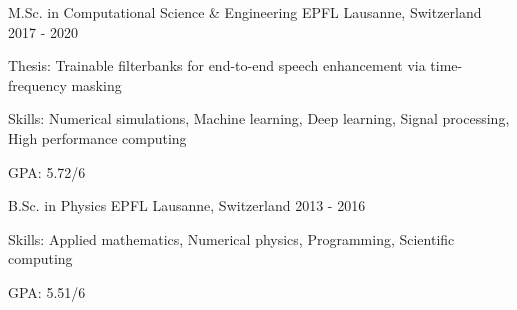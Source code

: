 

\begin{cventries}

  \cventry
    {M.Sc. in Computational Science \& Engineering} %
    {EPFL} %
    {Lausanne, Switzerland} %
    {2017 - 2020} %
    {
      \begin{cvitems} %
        \item {Thesis: Trainable filterbanks for end-to-end speech enhancement via time-frequency masking}
        \item {Skills: Numerical simulations, Machine learning, Deep learning, Signal processing, High performance computing}
        \item {GPA: 5.72/6}
      \end{cvitems}
    }

  \cventry
    {B.Sc. in Physics} %
    {EPFL} %
    {Lausanne, Switzerland} %
    {2013 - 2016} %
    {
      \begin{cvitems} %
        \item {Skills: Applied mathematics, Numerical physics, Programming, Scientific computing}
        \item {GPA: 5.51/6}
      \end{cvitems}
    }

\end{cventries}
